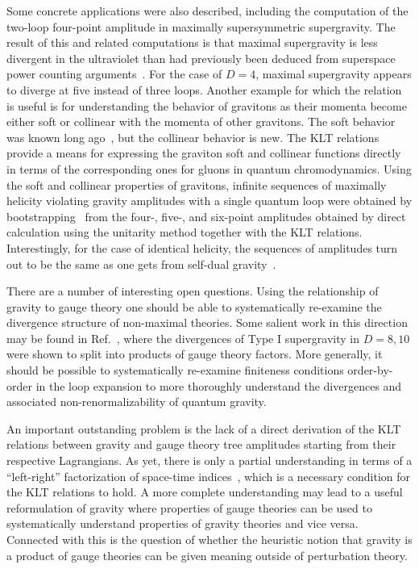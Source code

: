 \documentclass[12pt]{livrev}
\begin{document}
Some concrete applications were also described, including the
computation of the two-loop four-point amplitude in maximally
supersymmetric supergravity. The result of this and related
computations is that maximal supergravity is less divergent in the
ultraviolet than had previously been deduced from superspace power
counting arguments~\cite{BDDPR,Stelle}.  For the case of
$D=4$, maximal supergravity appears to diverge at five instead of
three loops.  Another example for which the relation is useful is for
understanding the behavior of gravitons as their momenta become either
soft or collinear with the momenta of other gravitons.  The soft
behavior was known long ago~\cite{WeinbergSoftG}, but the collinear
behavior is new.  The KLT relations provide a means for expressing the
graviton soft and collinear functions directly in terms of the
corresponding ones for gluons in quantum chromodynamics.  Using the
soft and collinear properties of gravitons, infinite sequences of
maximally helicity violating gravity amplitudes with a single quantum
loop were obtained by bootstrapping~\cite{AllPlusGrav,MHVGrav} from
the four-, five-, and six-point amplitudes obtained by direct
calculation using the unitarity method together with the KLT
relations.  Interestingly, for the case of identical helicity, the
sequences of amplitudes turn out to be the same as one gets from
self-dual gravity~\cite{Plebanski75,Duff79,Plebanski96}.

There are a number of interesting open questions.  Using the
relationship of gravity to gauge theory one should be able to
systematically re-examine the divergence structure of non-maximal
theories.  Some salient work in this direction may be found in
Ref.~\cite{DunbarJulia}, where the divergences of Type I supergravity
in $D=8, 10$ were shown to split into products of gauge theory
factors.  More generally, it should be possible to systematically
re-examine finiteness conditions order-by-order in the loop expansion
to more thoroughly understand the divergences and associated
non-renormalizability of quantum gravity.

An important outstanding problem is the lack of a direct derivation of
the KLT relations between gravity and gauge theory tree amplitudes
starting from their respective Lagrangians.  As yet, there is only a
partial understanding in terms of a ``left-right'' factorization of
space-time indices~\cite{Siegel93A,Siegel93B,Siegel94,BernGrant}, which
is a necessary condition for the KLT relations to hold.  A more
complete understanding may lead to a useful reformulation of gravity
where properties of gauge theories can be used to systematically
understand properties of gravity theories and vice versa.  Connected
with this is the question of whether the heuristic notion that gravity
is a product of gauge theories can be given meaning outside of
perturbation theory.
\end{document}
